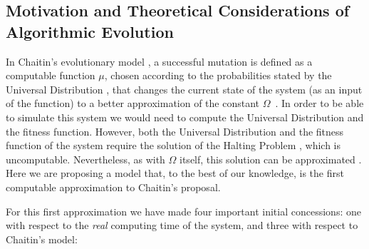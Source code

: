 \documentclass[10pt]{article}
\begin{document}
\subsection{Motivation and Theoretical Considerations of Algorithmic Evolution}

In Chaitin's evolutionary model \cite{chaitin:EvolofMutaSoft,ChaitinBook,ChaitinEvolvingSoftware}, a successful mutation is defined as a computable function $\mu$, chosen according to the probabilities stated by the Universal Distribution \cite{kirchherr1997miraculous,Solomonof03}, that changes the current state of the system (as an input of the function) to a better approximation of the constant $\Omega$~\cite{Chaitin74}. In order to be able to simulate this system we would need to compute the Universal Distribution and the fitness function. However, both the Universal Distribution and the fitness function of the system require the solution of the Halting Problem \cite{Turing}, which is uncomputable. Nevertheless, as with $\Omega$ itself, this solution can be approximated \cite{calude2002computing, zenil2016decomposition}. Here we are proposing a model that, to the best of our knowledge, is the first computable approximation to Chaitin's proposal.

For this first approximation we have made four important initial concessions: one with respect to the \textit{real} computing time of the system, and three with respect to Chaitin's model:
\end{document}
